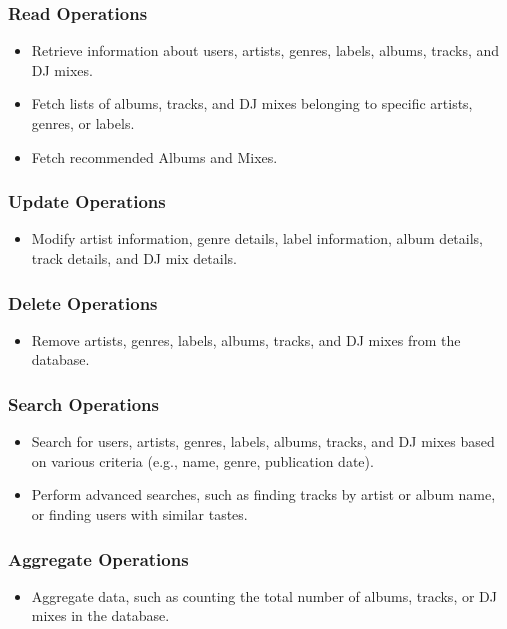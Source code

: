\documentclass{article}
\begin{document}
\subsubsection{Read Operations}
\begin{itemize}
    \item Retrieve information about users, artists, genres, labels, albums, tracks, and DJ mixes.
    \item Fetch lists of albums, tracks, and DJ mixes belonging to specific artists, genres, or labels.
    \item Fetch recommended Albums and Mixes.
\end{itemize}

\subsubsection{Update Operations}
\begin{itemize}
    \item Modify artist information, genre details, label information, album details, track details, and DJ mix details.
\end{itemize}

\subsubsection{Delete Operations}
\begin{itemize}
    \item Remove artists, genres, labels, albums, tracks, and DJ mixes from the database.
\end{itemize}

\subsubsection{Search Operations}
\begin{itemize}
    \item Search for users, artists, genres, labels, albums, tracks, and DJ mixes based on various criteria (e.g., name, genre, publication date).
    \item Perform advanced searches, such as finding tracks by artist or album name, or finding users with similar tastes.
\end{itemize}

\subsubsection{Aggregate Operations}
\begin{itemize}
    \item Aggregate data, such as counting the total number of albums, tracks, or DJ mixes in the database.
\end{itemize}
\end{document}
